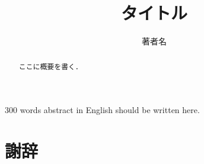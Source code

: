 \documentclass[system, master]{systemM}
\title{タイトル}
\author{著者名}
\begin{document}
\maketitle%

\frontmatter%


\begin{eabstract}%
 300 words abstract in English should be written here. 
\end{eabstract}

\begin{abstract}%
 ここに概要を書く．
\end{abstract}


{\makeatletter
\let\ps@jpl@in\ps@empty
\makeatother
\pagestyle{empty}
\tableofcontents
\clearpage}

\mainmatter%
\chapter{}

\backmatter%
\chapter{謝辞}%

\begin{thebibliography}{}%
 \bibitem{}
\end{thebibliography}

\appendix%
\chapter{}
\end{document}
